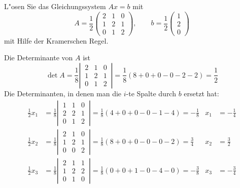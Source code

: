 L"osen Sie das Gleichungssystem $Ax=b$ mit
\[
A=\frac12\begin{pmatrix}2&1&0\\1&2&1\\0&1&2\end{pmatrix},\qquad
b=\frac12\begin{pmatrix}1\\2\\0\end{pmatrix}
\]
mit Hilfe der Kramerschen Regel.

\begin{loesung}
Die Determinante von $A$ ist
\[
\operatorname{det}A
=
\frac18
\left|\,\begin{matrix}2&1&0\\1&2&1\\0&1&2\end{matrix}\,\right|
=\frac18(8+0+0-0-2-2)=\frac12
\]
Die Determinanten, in denen man die $i$-te Spalte durch $b$ ersetzt hat:
\begin{align*}
\frac12 x_1&=
\frac18\left|\,\begin{matrix}
1&1&0\\
2&2&1\\
0&1&2\end{matrix}\,\right|
=\frac18(4+0+0-0-1-4)=-\frac18
&x_1&=-\frac14
\\
\frac12 x_2&=
\frac18\left|\,\begin{matrix}
2&1&0\\
1&2&1\\
0&0&2\end{matrix}\,\right|
=\frac18(8+0+0-0-0-2)=\frac34
&x_2&=\frac32
\\
\frac12 x_3&=
\frac18\left|\,\begin{matrix}
2&1&1\\
1&2&2\\
0&1&0\end{matrix}\,\right|
=\frac18(0+0+1-0-4-0)=-\frac38
&x_3&=-\frac34
\end{align*}
\end{loesung}


